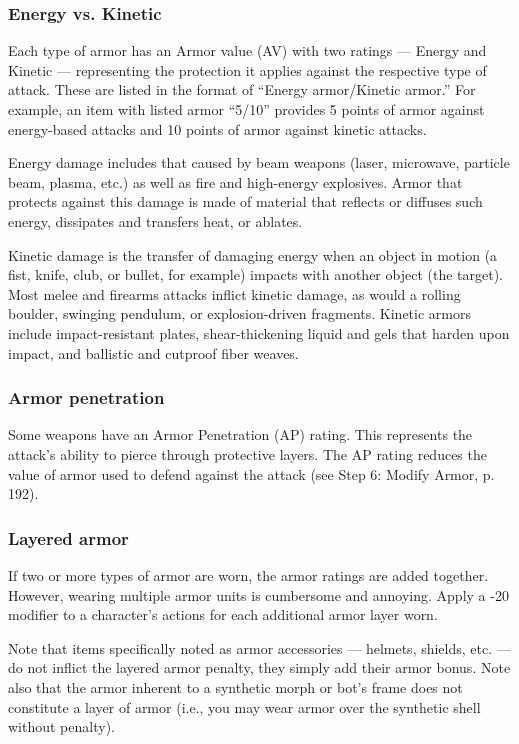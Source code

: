 \subsubsection{Energy vs. Kinetic} 

Each type of armor has an Armor value (AV) with two ratings --- Energy and Kinetic --- representing the protection it applies against the respective type of attack. These are listed in the format of ``Energy armor/Kinetic armor.'' For example, an item with listed armor ``5/10'' provides 5 points of armor against energy-based attacks and 10 points of armor against kinetic attacks. 

Energy damage includes that caused by beam weapons (laser, microwave, particle beam, plasma, etc.) as well as fire and high-energy explosives. Armor that protects against this damage is made of material that reflects or diffuses such energy, dissipates and transfers heat, or ablates. 

Kinetic damage is the transfer of damaging energy when an object in motion (a fist, knife, club, or bullet, for example) impacts with another object (the target). Most melee and firearms attacks inflict kinetic damage, as would a rolling boulder, swinging pendulum, or explosion-driven fragments. Kinetic armors include impact-resistant plates, shear-thickening liquid and gels that harden upon impact, and ballistic and cutproof fiber weaves. 

\subsubsection{Armor penetration} 

Some weapons have an Armor Penetration (AP) rating. This represents the attack’s ability to pierce through protective layers. The AP rating reduces the value of armor used to defend against the attack (see Step 6: Modify Armor, p. 192). 

\subsubsection{Layered armor} 

If two or more types of armor are worn, the armor ratings are added together. However, wearing multiple armor units is cumbersome and annoying. Apply a -20 modifier to a character’s actions for each additional armor layer worn. 

Note that items specifically noted as armor accessories --- helmets, shields, etc. --- do not inflict the layered armor penalty, they simply add their armor bonus. Note also that the armor inherent to a synthetic morph or bot’s frame does not constitute a layer of armor (i.e., you may wear armor over the synthetic shell without penalty). 



